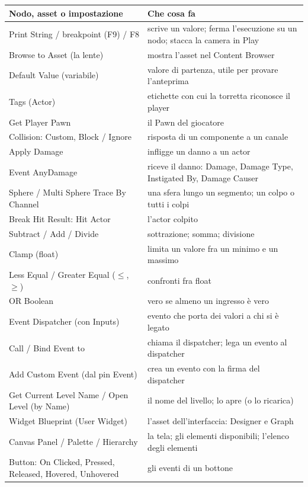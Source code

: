 \begin{table}[htbp]
\centering
\small
\begin{tabular}{@{}p{4.8cm}p{9.2cm}@{}}
\toprule
\textbf{Nodo, asset o impostazione} & \textbf{Che cosa fa} \\
\midrule
Print String / breakpoint (F9) / F8 & scrive un valore; ferma l'esecuzione su un nodo;
stacca la camera in Play \\
Browse to Asset (la lente) & mostra l'asset nel Content Browser \\
Default Value (variabile) & valore di partenza, utile per provare l'anteprima \\
Tags (Actor) & etichette con cui la torretta riconosce il player \\
Get Player Pawn & il Pawn del giocatore \\
Collision: Custom, Block / Ignore & risposta di un componente a un canale \\
Apply Damage & infligge un danno a un actor \\
Event AnyDamage & riceve il danno: Damage, Damage Type, Instigated By, Damage Causer \\
Sphere / Multi Sphere Trace By Channel & una sfera lungo un segmento; un colpo o tutti
i colpi \\
Break Hit Result: Hit Actor & l'actor colpito \\
Subtract / Add / Divide & sottrazione; somma; divisione \\
Clamp (float) & limita un valore fra un minimo e un massimo \\
Less Equal / Greater Equal ($\le$, $\ge$) & confronti fra float \\
OR Boolean & vero se almeno un ingresso è vero \\
Event Dispatcher (con Inputs) & evento che porta dei valori a chi si è legato \\
Call / Bind Event to & chiama il dispatcher; lega un evento al dispatcher \\
Add Custom Event (dal pin Event) & crea un evento con la firma del dispatcher \\
Get Current Level Name / Open Level (by Name) & il nome del livello; lo apre (o lo
ricarica) \\
Widget Blueprint (User Widget) & l'asset dell'interfaccia: Designer e Graph \\
Canvas Panel / Palette / Hierarchy & la tela; gli elementi disponibili; l'elenco degli
elementi \\
Button: On Clicked, Pressed, Released, Hovered, Unhovered & gli eventi di un bottone \\

\end{tabular}
\end{table}
